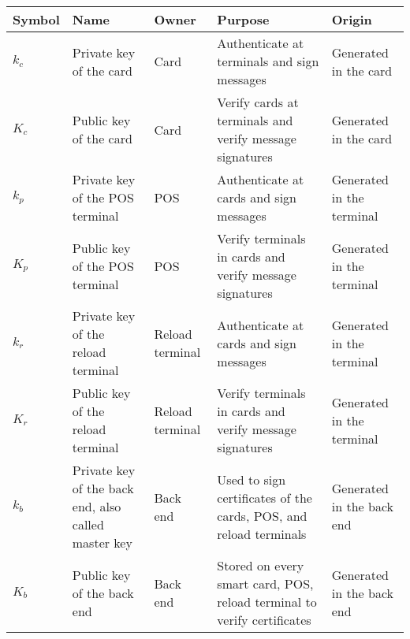 \begin{tabular}{|l|p{3cm}|p{1.5cm}|p{4.7cm}|p{2.7cm}|}
\hline
    Symbol & Name & Owner & Purpose & Origin \\
\hline
    $k_c$ & Private key of the card & Card & Authenticate at terminals and sign messages & Generated in the card \\
\hline
    $K_c$ & Public key of the card & Card & Verify cards at terminals and verify message signatures & Generated in the card \\
\hline
    $k_p$ & Private key of the POS terminal & POS & Authenticate at cards and sign messages& Generated in the terminal \\
\hline
    $K_p$ & Public key of the POS terminal & POS & Verify terminals in cards and verify message signatures & Generated in the terminal \\
\hline  
    $k_r$ & Private key of the reload terminal & Reload terminal & Authenticate at cards and sign messages & Generated in the terminal \\
\hline
    $K_r$ & Public key of the reload terminal & Reload terminal & Verify terminals in cards and verify message signatures & Generated in the terminal \\
\hline
    $k_b$ & Private key of the back end, also called master key & Back end & Used to sign certificates of the cards, POS, and reload terminals & Generated in the back end \\
\hline
    $K_b$ & Public key of the back end & Back end & Stored on every smart card, POS, reload terminal to verify certificates & Generated in the back end \\
\hline
\end{tabular}